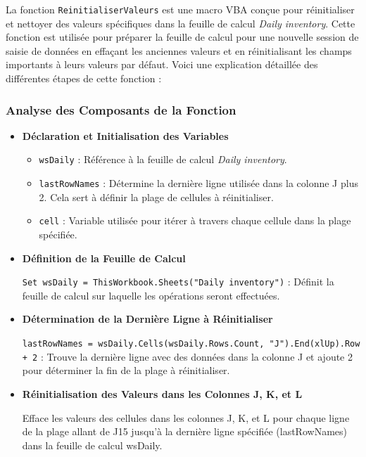 \documentclass[a4paper, oneside, 12pt, final]{extreport}
\begin{document}
La fonction \texttt{ReinitialiserValeurs} est une macro VBA conçue pour réinitialiser et nettoyer des valeurs spécifiques dans la feuille de calcul \textit{Daily inventory}. Cette fonction est utilisée pour préparer la feuille de calcul pour une nouvelle session de saisie de données en effaçant les anciennes valeurs et en réinitialisant les champs importants à leurs valeurs par défaut. Voici une explication détaillée des différentes étapes de cette fonction :




\subsubsection{Analyse des Composants de la Fonction}
\begin{itemize}

\item\textbf{Déclaration et Initialisation des Variables}

\begin{itemize}
    \item \texttt{wsDaily} : Référence à la feuille de calcul \textit{Daily inventory}.
    \item \texttt{lastRowNames} : Détermine la dernière ligne utilisée dans la colonne J plus 2. Cela sert à définir la plage de cellules à réinitialiser.
    \item \texttt{cell} : Variable utilisée pour itérer à travers chaque cellule dans la plage spécifiée.
\end{itemize}

\item\textbf{Définition de la Feuille de Calcul}

\texttt{Set wsDaily = ThisWorkbook.Sheets("Daily inventory")} : Définit la feuille de calcul sur laquelle les opérations seront effectuées.

\item\textbf{Détermination de la Dernière Ligne à Réinitialiser}

\texttt{lastRowNames = wsDaily.Cells(wsDaily.Rows.Count, "J").End(xlUp).Row + 2} : Trouve la dernière ligne avec des données dans la colonne J et ajoute 2 pour déterminer la fin de la plage à réinitialiser.

\item\textbf{Réinitialisation des Valeurs dans les Colonnes J, K, et L}

Efface les valeurs des cellules dans les colonnes J, K, et L pour chaque ligne de la plage allant de J15 jusqu'à la dernière ligne spécifiée (lastRowNames) dans la feuille de calcul wsDaily.


\end{itemize}
\end{document}
